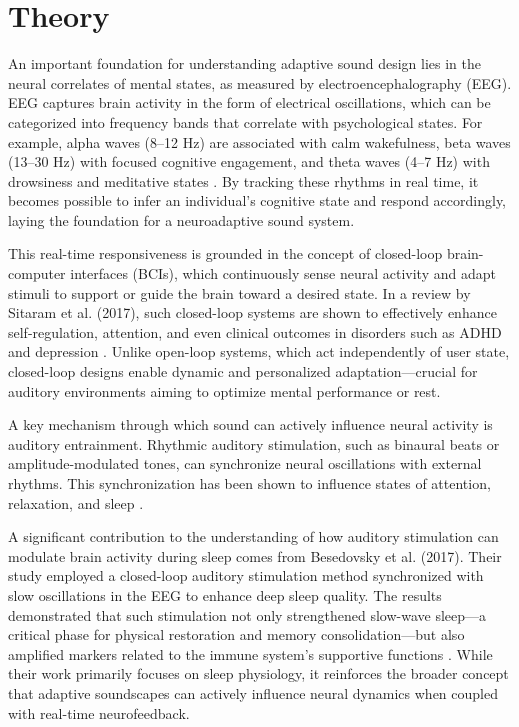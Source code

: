 \section{Theory}

An important foundation for understanding adaptive sound design lies in the neural correlates of mental states, as measured by electroencephalography (EEG). EEG captures brain activity in the form of electrical oscillations, which can be categorized into frequency bands that correlate with psychological states. For example, alpha waves (8–12 Hz) are associated with calm wakefulness, beta waves (13–30 Hz) with focused cognitive engagement, and theta waves (4–7 Hz) with drowsiness and meditative states \cite{klimesch1999}. By tracking these rhythms in real time, it becomes possible to infer an individual’s cognitive state and respond accordingly, laying the foundation for a neuroadaptive sound system.

This real-time responsiveness is grounded in the concept of closed-loop brain-computer interfaces (BCIs), which continuously sense neural activity and adapt stimuli to support or guide the brain toward a desired state. In a review by Sitaram et al. (2017), such closed-loop systems are shown to effectively enhance self-regulation, attention, and even clinical outcomes in disorders such as ADHD and depression \cite{sitaram2017}. Unlike open-loop systems, which act independently of user state, closed-loop designs enable dynamic and personalized adaptation—crucial for auditory environments aiming to optimize mental performance or rest.

A key mechanism through which sound can actively influence neural activity is auditory entrainment. Rhythmic auditory stimulation, such as binaural beats or amplitude-modulated tones, can synchronize neural oscillations with external rhythms. This synchronization has been shown to influence states of attention, relaxation, and sleep \cite{nozaradan2014}.

A significant contribution to the understanding of how auditory stimulation can modulate brain activity during sleep comes from Besedovsky et al. (2017). Their study employed a closed-loop auditory stimulation method synchronized with slow oscillations in the EEG to enhance deep sleep quality. The results demonstrated that such stimulation not only strengthened slow-wave sleep—a critical phase for physical restoration and memory consolidation—but also amplified markers related to the immune system's supportive functions \cite{besedovsky2017}. While their work primarily focuses on sleep physiology, it reinforces the broader concept that adaptive soundscapes can actively influence neural dynamics when coupled with real-time neurofeedback.

